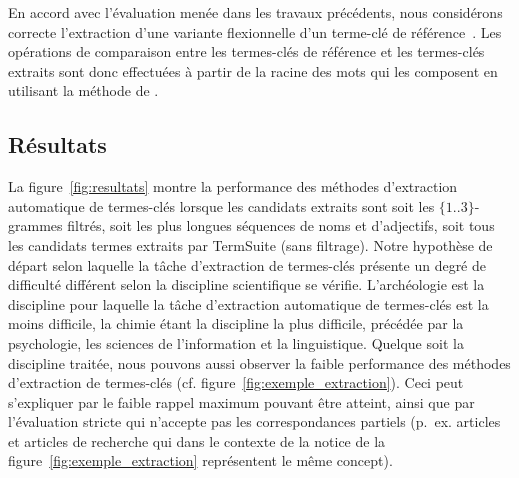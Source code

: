    En accord avec l'évaluation menée dans les travaux précédents, nous
    considérons correcte l'extraction d'une variante flexionnelle d'un terme-clé
    de référence~\cite{kim2010semeval}. Les opérations de comparaison entre les
    termes-clés de référence et les termes-clés extraits sont donc effectuées à
    partir de la racine des mots qui les composent en utilisant la méthode de
    .

  \subsection{Résultats}
  \label{subsec:resultats}
    La figure~\ref{fig:resultats} montre la performance des méthodes
    d'extraction automatique de termes-clés lorsque les candidats extraits sont
    soit les $\{1..3\}$-grammes filtrés, soit les plus longues séquences de noms
    et d'adjectifs, soit tous les candidats termes extraits par TermSuite (sans
    filtrage). Notre hypothèse de départ selon laquelle la tâche d'extraction de
    termes-clés présente un degré de difficulté différent selon la discipline
    scientifique se vérifie. L'archéologie est la discipline pour laquelle la
    tâche d'extraction automatique de termes-clés est la moins difficile, la
    chimie étant la discipline la plus difficile, précédée par la psychologie,
    les sciences de l'information et la linguistique. Quelque soit la discipline
    traitée, nous pouvons aussi observer la faible performance des méthodes
    d'extraction de termes-clés (cf. figure~\ref{fig:exemple_extraction}). Ceci
    peut s'expliquer par le faible rappel maximum pouvant être atteint, ainsi
    que par l'évaluation stricte qui n'accepte pas les correspondances partiels
    (p.~ex. \og{}articles\fg{} et \og{}articles de recherche\fg{} qui dans le
    contexte de la notice de la figure~\ref{fig:exemple_extraction} représentent
    le même concept).

